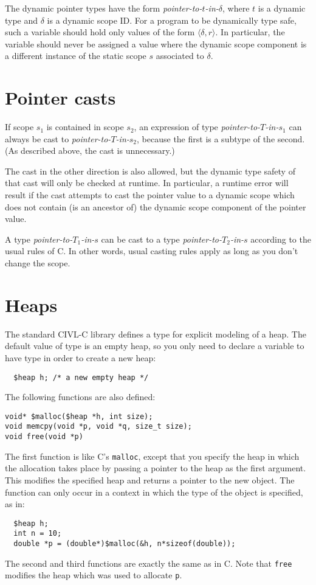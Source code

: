 \documentclass[11pt]{book}
\begin{document}
The dynamic pointer types have the form
\emph{pointer-to-$t$-in-$\delta$}, where $t$ is a dynamic type and
$\delta$ is a dynamic scope ID.  For a program to be dynamically type
safe, such a variable should hold only values of the form $\langle
\delta, r\rangle$.  In particular, the variable should never be
assigned a value where the dynamic scope component is a different
instance of the static scope $s$ associated to $\delta$.

\section{Pointer casts}

If scope $s_1$ is contained in scope $s_2$, an expression of type
\emph{pointer-to-$T$-in-$s_1$} can always be cast to
\emph{pointer-to-$T$-in-$s_2$},
 because the first is a subtype of the second.  (As described above,
the cast is unnecessary.)  

The cast in the other direction is also allowed, but the dynamic type
safety of that cast will only be checked at runtime.  In particular, a
runtime error will result if the cast attempts to cast the pointer
value to a dynamic scope which does not contain (is an ancestor of)
the dynamic scope component of the pointer value.

A type \emph{pointer-to-$T_1$-in-$s$} can be cast to a type
\emph{pointer-to-$T_2$-in-$s$} according to the usual rules of C.  In
other words, usual casting rules apply as long as you don't change the
scope.



\section{Heaps}

The standard CIVL-C library defines a type \cheap{} for explicit
modeling of a heap.  The default value of \cheap{} type is an empty
heap, so you only need to declare a variable to have type \cheap{}
in order to create a new heap:
\begin{verbatim}
  $heap h; /* a new empty heap */
\end{verbatim}

The following functions are also defined:
\begin{verbatim}
void* $malloc($heap *h, int size);
void memcpy(void *p, void *q, size_t size);
void free(void *p)
\end{verbatim}
The first function is like C's \texttt{malloc}, except that you
specify the heap in which the allocation takes place by passing a
pointer to the heap as the first argument.  This modifies the
specified heap and returns a pointer to the new object.  The function
can only occur in a context in which the type of the object is
specified, as in:
\begin{verbatim}
  $heap h;
  int n = 10;
  double *p = (double*)$malloc(&h, n*sizeof(double));
\end{verbatim}
The second and third functions are exactly the same as in C. Note that
\texttt{free} modifies the heap which was used to allocate \texttt{p}.
\end{document}
